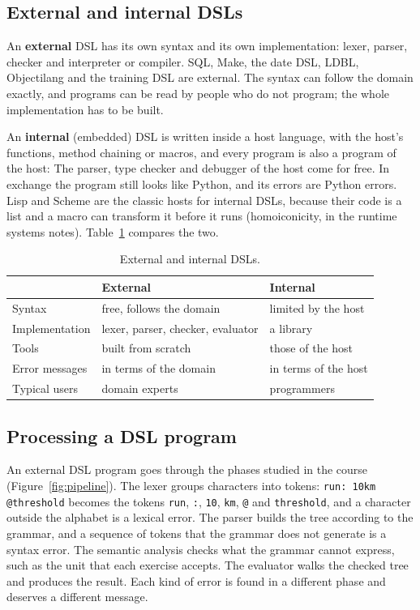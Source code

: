 \subsection{External and internal DSLs}

An \textbf{external} DSL has its own syntax and its own implementation: lexer,
parser, checker and interpreter or compiler. SQL, Make, the date DSL, LDBL,
Objectilang and the training DSL are external. The syntax can follow the
domain exactly, and programs can be read by people who do not program; the
whole implementation has to be built.

An \textbf{internal} (embedded) DSL is written inside a host language, with the
host's functions, method chaining or macros, and every program is also a
program of the host:
The parser, type checker and debugger of the host come for free. In exchange
the program still looks like Python, and its errors are Python errors. Lisp
and Scheme are the classic hosts for internal DSLs, because their code is a
list and a macro can transform it before it runs (homoiconicity, in the
runtime systems notes). Table~\ref{tab:ext-int} compares the two.

\begin{table}[h]
\centering
\begin{tabular}{@{}p{3.2cm}p{5cm}p{5cm}@{}}
\toprule
& External & Internal \\
\midrule
Syntax & free, follows the domain & limited by the host \\
Implementation & lexer, parser, checker, evaluator & a library \\
Tools & built from scratch & those of the host \\
Error messages & in terms of the domain & in terms of the host \\
Typical users & domain experts & programmers \\
\bottomrule
\end{tabular}
\caption{External and internal DSLs.}
\label{tab:ext-int}
\end{table}

\subsection{Processing a DSL program}

An external DSL program goes through the phases studied in the course
(Figure~\ref{fig:pipeline}). The lexer groups characters into tokens:
\texttt{run: 10km @threshold} becomes the tokens \texttt{run}, \texttt{:},
\texttt{10}, \texttt{km}, \texttt{@} and \texttt{threshold}, and a character
outside the alphabet is a lexical error. The parser builds the tree according
to the grammar, and a sequence of tokens that the grammar does not generate is
a syntax error. The semantic analysis checks what the grammar cannot express,
such as the unit that each exercise accepts. The evaluator walks the checked
tree and produces the result. Each kind of error is found in a different
phase and deserves a different message.


